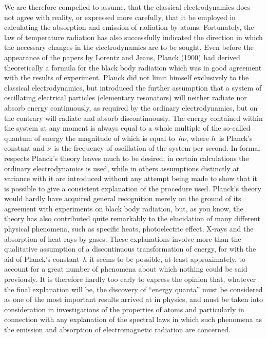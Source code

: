 We are therefore compelled to assume, that the classical electrodynamics
does not agree with reality, or expressed more carefully,
that it  be employed in calculating the absorption and
emission of radiation by atoms. Fortunately, the law of temperature
radiation has also successfully indicated the direction in which the
necessary changes in the electrodynamics are to be sought. Even
before the appearance of the papers by Lorentz and Jeans, Planck
(1900) had derived theoretically a formula for the black body radiation
which was in good agreement with the results of experiment.
Planck did not limit himself exclusively to the classical electrodynamics,
but introduced the further assumption that a system of
oscillating electrical particles (elementary resonators) will neither
radiate nor absorb energy continuously, as required by the ordinary
electrodynamics, but on the contrary will radiate and absorb discontinuously.
The energy contained within the system at any
moment is always equal to a whole multiple of the so-called
quantum of energy the magnitude of which is equal to~$h\nu$, where
$h$~is Planck's constant and $\nu$~is the frequency of oscillation of the
system per second. In formal respects Planck's theory leaves much
to be desired; in certain calculations the ordinary electrodynamics
is used, while in others assumptions distinctly at variance with it
are introduced without any attempt being made to show that it
is possible to give a consistent explanation of the procedure used.
Planck's theory would hardly have acquired general recognition
merely on the ground of its agreement with experiments on black
body radiation, but, as you know, the theory has also contributed
quite remarkably to the elucidation of many different physical
phenomena, such as specific heats, photoelectric effect, X-rays and
the absorption of heat rays by gases. These explanations involve
more than the qualitative assumption of a discontinuous transformation
of energy, for with the aid of Planck's constant~$h$ it
seems to be possible, at least approximately, to account for a great
number of phenomena about which nothing could be said previously.
It is therefore hardly too early to express the opinion that, whatever
the final explanation will be, the discovery of ``energy quanta''
must be considered as one of the most important results arrived at
in physics, and must be taken into consideration in investigations
of the properties of atoms and particularly in connection with any
explanation of the spectral laws in which such phenomena as
the emission and absorption of electromagnetic radiation are
concerned.

